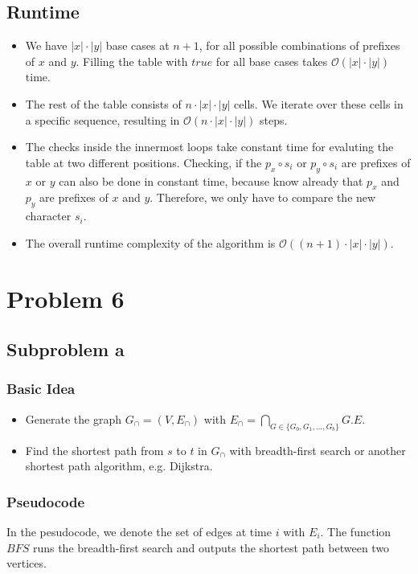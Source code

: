 \documentclass[12pt]{article}
\begin{document}
\subsection*{Runtime}
\begin{itemize}
	\item We have $|x| \cdot |y|$ base cases at $n+1$, for all possible combinations of prefixes of $x$ and $y$. Filling the table with $\mathit{true}$ for all base cases takes $\mathcal{O}(|x| \cdot |y|)$ time.
	\item The rest of the table consists of $n \cdot |x| \cdot |y|$ cells. We iterate over these cells in a specific sequence, resulting in $\mathcal{O}(n \cdot |x| \cdot |y|)$ steps.
	\item The checks inside the innermost loops take constant time for evaluting the table at two different positions. Checking, if the $p_x \circ s_i$ or $p_y \circ s_i$ are prefixes of $x$ or $y$ can also be done in constant time, because know already that $p_x$ and $p_y$ are prefixes of $x$ and $y$. Therefore, we only have to compare the new character $s_i$.
	\item The overall runtime complexity of the algorithm is $\mathcal{O}((n+1) \cdot |x| \cdot |y|)$.
\end{itemize}

\section*{Problem 6}
\subsection*{Subproblem a}
\subsubsection*{Basic Idea}
\begin{itemize}
	\item Generate the graph $G_\cap = (V, E_\cap)$ with $E_\cap = \bigcap_{G \in \{G_0, G_1, \ldots, G_b\}} G.E$.
	\item Find the shortest path from $s$ to $t$ in $G_\cap$ with breadth-first search or another shortest path algorithm, e.g. Dijkstra.
\end{itemize}

\subsubsection*{Pseudocode}
In the pesudocode, we denote the set of edges at time $i$ with $E_i$. The function $BFS$ runs the breadth-first search and outputs the shortest path between two vertices.
\end{document}
